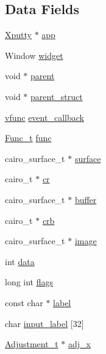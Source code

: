 \subsection*{Data Fields}
\begin{DoxyCompactItemize}
\item 
\hyperlink{structXputty}{Xputty} $\ast$ \hyperlink{structWidget__t_a06eaa5b134c47983fd965e745cdbaa3b}{app}
\item 
Window \hyperlink{structWidget__t_acb2bfb41674371ee1220a9d6a2d89fb1}{widget}
\item 
void $\ast$ \hyperlink{structWidget__t_a483f6517c19fe09e1bf2eaec6646a14b}{parent}
\item 
void $\ast$ \hyperlink{structWidget__t_adb548fa6377a020f0563c71382305bad}{parent\+\_\+struct}
\item 
\hyperlink{xwidget_8h_a6423c133fb634585762a77dda34befab}{vfunc} \hyperlink{structWidget__t_af0adf855c1991d11f59c5b6f9a2c526a}{event\+\_\+callback}
\item 
\hyperlink{structFunc__t}{Func\+\_\+t} \hyperlink{structWidget__t_a225b9a175e132994a5aa73b59a2911ad}{func}
\item 
cairo\+\_\+surface\+\_\+t $\ast$ \hyperlink{structWidget__t_ae9b5979742ea31817ff7d7b34a56f88d}{surface}
\item 
cairo\+\_\+t $\ast$ \hyperlink{structWidget__t_a26594f6ffabe98fc08f9207150fc9417}{cr}
\item 
cairo\+\_\+surface\+\_\+t $\ast$ \hyperlink{structWidget__t_a84d225e7b261d67daa764b47c8c62107}{buffer}
\item 
cairo\+\_\+t $\ast$ \hyperlink{structWidget__t_ad98022ee160d4c0906110868fc9e5664}{crb}
\item 
cairo\+\_\+surface\+\_\+t $\ast$ \hyperlink{structWidget__t_a4e179b5ae7494b9533c8673ec3642a55}{image}
\item 
int \hyperlink{structWidget__t_a9dd7b58be77bf31ab021aa627a73186a}{data}
\item 
long int \hyperlink{structWidget__t_ada1de5e6a955dc81fa956c9e7f2d2062}{flags}
\item 
const char $\ast$ \hyperlink{structWidget__t_a952020107ac1f6d9a37b4f978f77b61c}{label}
\item 
char \hyperlink{structWidget__t_ac5cb454301472edeb16e563ef2149dbb}{input\+\_\+label} \mbox{[}32\mbox{]}
\item 
\hyperlink{structAdjustment__t}{Adjustment\+\_\+t} $\ast$ \hyperlink{structWidget__t_aabc05e0a46c85d24483fae36127b45dd}{adj\+\_\+x}
\item 

\end{DoxyCompactItemize}
